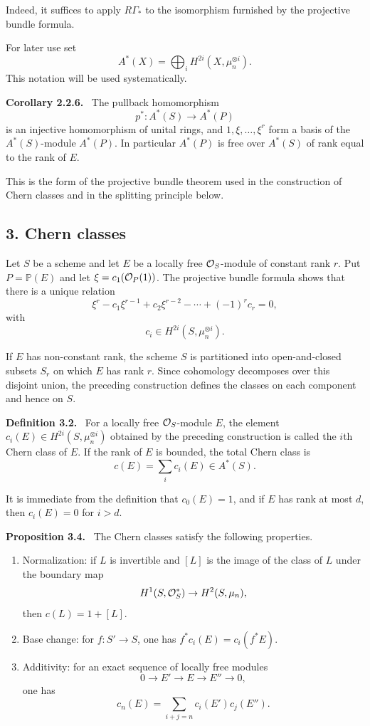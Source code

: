 \documentclass[11pt]{article}
\theoremstyle{plain}
\theoremstyle{definition}
\theoremstyle{remark}
\newenvironment{statement}[1]{\par\medskip\noindent\textbf{#1.}\ }{\par\medskip}
\begin{document}
Indeed, it suffices to apply $R\Gamma_*$ to the isomorphism furnished by the projective bundle formula.

For later use set
\[
   A^*(X)=\bigoplus_i H^{2i}(X,\mu_n^{\otimes i}).
\]
This notation will be used systematically.

\begin{statement}{Corollary 2.2.6}
The pullback homomorphism
\[
   p^*:A^*(S)\longrightarrow A^*(P)
\]
is an injective homomorphism of unital rings, and $1,\xi,\ldots,\xi^r$ form a basis of the $A^*(S)$-module $A^*(P)$. In particular $A^*(P)$ is free over $A^*(S)$ of rank equal to the rank of $E$.
\end{statement}

This is the form of the projective bundle theorem used in the construction of Chern classes and in the splitting principle below.

\subsection*{3. Chern classes}

Let $S$ be a scheme and let $E$ be a locally free $\mathcal O_S$-module of constant rank $r$. Put $P=\mathbb P(E)$ and let $\xi=c_1(\mathcal O_P(1))$. The projective bundle formula shows that there is a unique relation
\[
   \xi^r-c_1\xi^{r-1}+c_2\xi^{r-2}-\cdots+(-1)^r c_r=0,
\]
with
\[
   c_i\in H^{2i}(S,\mu_n^{\otimes i}).
\]

If $E$ has non-constant rank, the scheme $S$ is partitioned into open-and-closed subsets $S_r$ on which $E$ has rank $r$. Since cohomology decomposes over this disjoint union, the preceding construction defines the classes on each component and hence on $S$.

\begin{statement}{Definition 3.2}
For a locally free $\mathcal O_S$-module $E$, the element $c_i(E)\in H^{2i}(S,\mu_n^{\otimes i})$ obtained by the preceding construction is called the $i$th Chern class of $E$. If the rank of $E$ is bounded, the total Chern class is
\[
   c(E)=\sum_i c_i(E)\in A^*(S).
\]
\end{statement}

It is immediate from the definition that $c_0(E)=1$, and if $E$ has rank at most $d$, then $c_i(E)=0$ for $i>d$.

\begin{statement}{Proposition 3.4}
The Chern classes satisfy the following properties.
\begin{enumerate}[label=(\roman*)]
\item Normalization: if $L$ is invertible and $[L]$ is the image of the class of $L$ under the boundary map
\[
   H^1(S,\mathcal O_S^*)\to H^2(S,\mu_n),
\]
then $c(L)=1+[L]$.
\item Base change: for $f:S'\to S$, one has $f^*c_i(E)=c_i(f^*E)$.
\item Additivity: for an exact sequence of locally free modules
\[
   0\to E'\to E\to E''\to0,
\]
one has
\[
   c_n(E)=\sum_{i+j=n}c_i(E')c_j(E'').
\]
\end{enumerate}
\end{statement}
\end{document}
